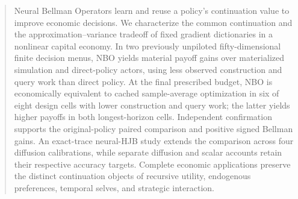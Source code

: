 \begin{abstract}
Neural Bellman Operators learn and reuse a policy's continuation value to improve economic decisions. We characterize the common continuation and the approximation--variance tradeoff of fixed gradient dictionaries in a nonlinear capital economy. In two previously unpiloted fifty-dimensional finite decision menus, NBO yields material payoff gains over materialized simulation and direct-policy actors, using less observed construction and query work than direct policy. At the final prescribed budget, NBO is economically equivalent to cached sample-average optimization in six of eight design cells with lower construction and query work; the latter yields higher payoffs in both longest-horizon cells. Independent confirmation supports the original-policy paired comparison and positive signed Bellman gains. An exact-trace neural-HJB study extends the comparison across four diffusion calibrations, while separate diffusion and scalar accounts retain their respective accuracy targets. Complete economic applications preserve the distinct continuation objects of recursive utility, endogenous preferences, temporal selves, and strategic interaction.
\end{abstract}
